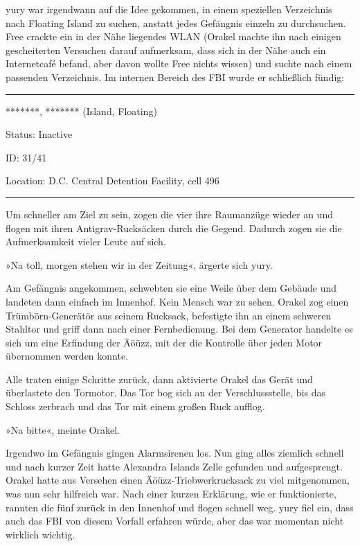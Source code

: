 yury war irgendwann auf die Idee gekommen, in einem speziellen Verzeichnis nach Floating Island zu suchen, anstatt jedes Gefängnis einzeln zu durchsuchen. Free crackte ein in der Nähe liegendes WLAN (Orakel machte ihn nach einigen gescheiterten Versuchen darauf aufmerksam, dass sich in der Nähe auch ein Internetcafé befand, aber davon wollte Free nichts wissen) und suchte nach einem passenden Verzeichnis. Im internen Bereich des FBI wurde er schließlich fündig:

\noindent \parbox{\textwidth}{ \vspace{3ex} \hrule \vspace{3ex}

    \begin{footnotesize}
    \begin{ttfamily}

\noindent ********, ******* (Island, Floating)

\noindent Status: Inactive

\noindent ID: 31/41

\noindent Location: D.C. Central Detention Facility, cell 496

    \end{ttfamily}
    \end{footnotesize}

\vspace{3ex} \hrule \vspace{3ex} }

Um schneller am Ziel zu sein, zogen die vier ihre Raumanzüge wieder an und flogen mit ihren Antigrav-Rucksäcken durch die Gegend. Dadurch zogen sie die Aufmerksamkeit vieler Leute auf sich.

»Na toll, morgen stehen wir in der Zeitung«, ärgerte sich yury.

Am Gefängnis angekommen, schwebten sie eine Weile über dem Gebäude und landeten dann einfach im Innenhof. Kein Mensch war zu sehen. Orakel zog einen Trümbörn-Generätör aus seinem Rucksack, befestigte ihn an einem schweren Stahltor und griff dann nach einer Fernbedienung. Bei dem Generator handelte es sich um eine Erfindung der Äöüzz, mit der die Kontrolle über jeden Motor übernommen werden konnte.

Alle traten einige Schritte zurück, dann aktivierte Orakel das Gerät und überlastete den Tormotor. Das Tor bog sich an der Verschlussstelle, bis das Schloss zerbrach und das Tor mit einem großen Ruck aufflog.

»Na bitte«, meinte Orakel.

Irgendwo im Gefängnis gingen Alarmsirenen los. Nun ging alles ziemlich schnell und nach kurzer Zeit hatte Alexandra Islands Zelle gefunden und aufgesprengt. Orakel hatte aus Versehen einen Äöüzz-Triebwerkrucksack zu viel mitgenommen, was nun sehr hilfreich war. Nach einer kurzen Erklärung, wie er funktionierte, rannten die fünf zurück in den Innenhof und flogen schnell weg. yury fiel ein, dass auch das FBI von diesem Vorfall erfahren würde, aber das war momentan nicht wirklich wichtig.


